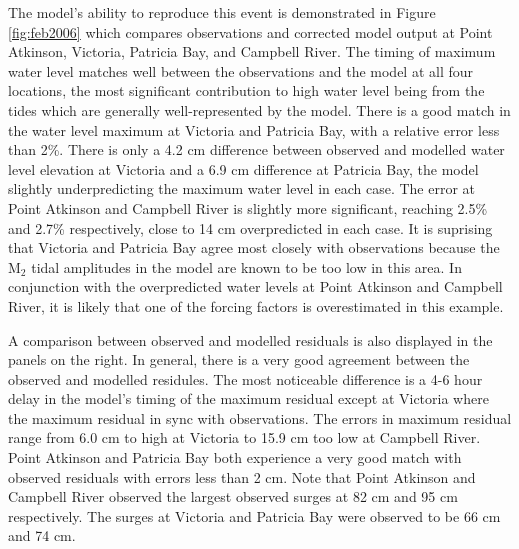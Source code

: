 \documentclass[pdftex,10pt]{article}
\begin{document}
The model's ability to reproduce this event is demonstrated in Figure \ref{fig:feb2006} which compares observations and corrected model output at Point Atkinson, Victoria, Patricia Bay, and Campbell River. The timing of maximum water level matches well between the observations and the model at all four locations, the most significant contribution to high water level being from the tides which are generally well-represented by the model. There is a good match in the water level maximum at Victoria and Patricia Bay, with a relative error less than 2\%. There is only a 4.2 cm difference between observed and modelled water level elevation at Victoria and a 6.9 cm difference at Patricia Bay, the model slightly underpredicting the maximum water level in each case. The error at Point Atkinson and Campbell River is slightly more significant, reaching 2.5\% and 2.7\% respectively, close to 14 cm overpredicted in each case. It is suprising that Victoria and Patricia Bay agree most closely with observations because the M$_2$ tidal amplitudes in the model are known to be too low in this area. In conjunction with the overpredicted water levels at Point Atkinson and Campbell River, it is likely that one of the forcing factors is overestimated in this example. 

A comparison between observed and modelled residuals is also displayed in the panels on the right. In general, there is a very good agreement between the observed and modelled residules. The most noticeable difference is a 4-6 hour delay in the model's timing of the maximum residual except at Victoria where the maximum residual in sync with observations. The errors in maximum residual range from 6.0 cm to high at Victoria to 15.9 cm too low at Campbell River. Point Atkinson and Patricia Bay both experience a very good match with observed residuals with errors less than 2 cm. Note that Point Atkinson and Campbell River observed the largest observed surges at 82 cm and 95 cm respectively. The surges at Victoria and Patricia Bay were observed to be 66 cm and 74 cm. 
\end{document}
